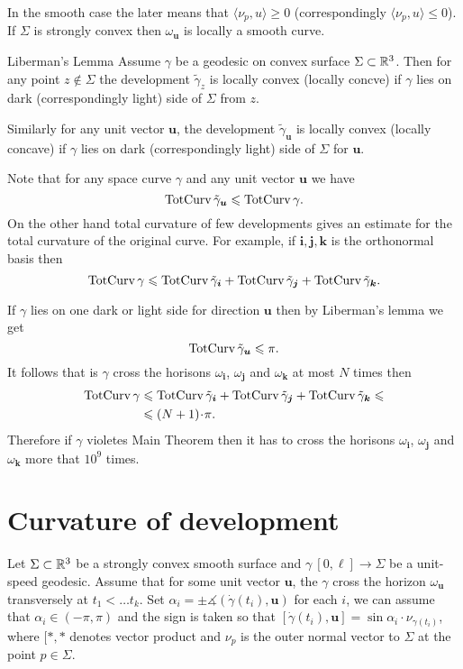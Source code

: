 \documentclass[a4paper,10pt]{amsart}
\begin{document}
In the smooth case the later means that $\langle \nu_p,u\rangle\ge 0$ (correspondingly $\langle \nu_p,u\rangle\le 0$).
If $\Sigma$ is strongly convex then $\omega_{\bm{u}}$ is locally a smooth curve.

\begin{thm}{Liberman's Lemma}\label{lem:liberman}
Assume $\gamma$ be a geodesic on convex surface $\Sigma\subset \mathbb{R}^3$.
Then for any point $z\notin\Sigma$ the development $\tilde\gamma_z$ is locally convex (locally concve) if $\gamma$ lies on dark (correspondingly light) side of $\Sigma$ from $z$.

Similarly for any unit vector $\bm{u}$,
the development $\tilde\gamma_{\bm{u}}$ is locally convex (locally concave) if $\gamma$ lies on dark (correspondingly light) side of $\Sigma$ for $\bm{u}$.

\end{thm}

Note that for any space curve $\gamma$ and any unit vector $\bm{u}$
we have 
\[\mathop{\rm TotCurv}\nolimits\tilde\gamma_{\bm{u}}\leqslant\mathop{\rm TotCurv}\nolimits\gamma.\]
On the other hand total curvature of few developments gives an estimate 
for the total curvature of the original curve.
For example, if $\bm{i},\bm{j},\bm{k}$ is the orthonormal basis then
\[\mathop{\rm TotCurv}\nolimits\gamma
\leqslant
\mathop{\rm TotCurv}\nolimits\tilde\gamma_{\bm{i}}+\mathop{\rm TotCurv}\nolimits\tilde\gamma_{\bm{j}}+\mathop{\rm TotCurv}\nolimits\tilde\gamma_{\bm{k}}.\]

If $\gamma$ lies on one dark or light side for direction $\bm{u}$
then by Liberman's lemma we get 
\[\mathop{\rm TotCurv}\nolimits\tilde\gamma_{\bm{u}}\leqslant \pi.\]
It follows that is $\gamma$ cross the horisons $\omega_{\bm{i}}$, $\omega_{\bm{j}}$ and $\omega_{\bm{k}}$
at most $N$ times then 
\begin{align*}
\tc\gamma
&\le
\tc\tilde\gamma_{\bm{i}}
+\tc\tilde\gamma_{\bm{j}}
+\tc\tilde\gamma_{\bm{k}}
\le
\\
&\le(N+1)\cdot \pi.
\end{align*}
Therefore if $\gamma$ violetes Main Theorem then it has to cross the  horisons $\omega_{\bm{i}}$, $\omega_{\bm{j}}$ and $\omega_{\bm{k}}$ more that $10^9$ times.%

\section{Curvature of development}

Let $\Sigma\subset\mathbb{R}^3$
be a strongly convex smooth surface
and $\gamma\:[0,\ell]\to \Sigma$ be a unit-speed geodesic.
Assume that for some unit vector $\bm{u}$,
the $\gamma$ cross the horizon $\omega_{\bm{u}}$ transversely at 
$t_1<\dots t_k$.
Set $\alpha_i=\pm\measuredangle(\dot\gamma(t_i),\bm{u})$ for each $i$,
we can assume that $\alpha_i\in(-\pi,\pi)$ 
and the sign is taken so that 
$[\dot\gamma(t_i),\bm{u}]=\sin\alpha_i\cdot\nu_{\gamma(t_i)}$,
where $[{*},{*}$ denotes vector product 
and $\nu_p$ is the outer normal vector to $\Sigma$ at the point $p\in\Sigma$.
\end{document}
